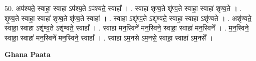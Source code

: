 \documentclass[17pt]{extarticle}
\begin{document}
50. अप॑श्यते॒ स्वाहा॒ स्वाहा ऽप॑श्य॒ते ऽप॑श्यते॒ स्वाहा᳚ । . स्वाहा॑ शृण्व॒ते शृ॑ण्व॒ते स्वाहा॒ स्वाहा॑ शृण्व॒ते । . शृ॒ण्व॒ते स्वाहा॒ स्वाहा॑ शृण्व॒ते शृ॑ण्व॒ते स्वाहा᳚ । . स्वाहा ऽशृ॑ण्व॒ते ऽशृ॑ण्वते॒ स्वाहा॒ स्वाहा ऽशृ॑ण्वते । . अशृ॑ण्वते॒ स्वाहा॒ स्वाहा ऽशृ॑ण्व॒ते ऽशृ॑ण्वते॒ स्वाहा᳚ । . स्वाहा॑ मन॒स्विने॑ मन॒स्विने॒ स्वाहा॒ स्वाहा॑ मन॒स्विने᳚ । . म॒न॒स्विने॒ स्वाहा॒ स्वाहा॑ मन॒स्विने॑ मन॒स्विने॒ स्वाहा᳚ । . स्वाहा॑ ऽम॒नसे॑ ऽम॒नसे॒ स्वाहा॒ स्वाहा॑ ऽम॒नसे᳚ । \newline

\textbf{Ghana Paata } \newline
\end{document}

